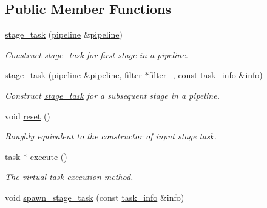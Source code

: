 \subsection*{Public Member Functions}
\begin{DoxyCompactItemize}
\item 
\hyperlink{classtbb_1_1internal_1_1stage__task_a7bfb2f0b49fa4d359d6466e2e291f041}{stage\+\_\+task} (\hyperlink{classtbb_1_1pipeline}{pipeline} \&\hyperlink{classtbb_1_1pipeline}{pipeline})
\begin{DoxyCompactList}\small\item\em Construct \hyperlink{classtbb_1_1internal_1_1stage__task}{stage\+\_\+task} for first stage in a pipeline. \end{DoxyCompactList}\item 
\hypertarget{classtbb_1_1internal_1_1stage__task_a7ace85497c8cb1d949ddd3a174d2bd1b}{}\hyperlink{classtbb_1_1internal_1_1stage__task_a7ace85497c8cb1d949ddd3a174d2bd1b}{stage\+\_\+task} (\hyperlink{classtbb_1_1pipeline}{pipeline} \&\hyperlink{classtbb_1_1pipeline}{pipeline}, \hyperlink{classtbb_1_1filter}{filter} $\ast$filter\+\_\+, const \hyperlink{structtbb_1_1internal_1_1task__info}{task\+\_\+info} \&info)\label{classtbb_1_1internal_1_1stage__task_a7ace85497c8cb1d949ddd3a174d2bd1b}

\begin{DoxyCompactList}\small\item\em Construct \hyperlink{classtbb_1_1internal_1_1stage__task}{stage\+\_\+task} for a subsequent stage in a pipeline. \end{DoxyCompactList}\item 
\hypertarget{classtbb_1_1internal_1_1stage__task_aa255c23e66c40065595caef2d9dda709}{}void \hyperlink{classtbb_1_1internal_1_1stage__task_aa255c23e66c40065595caef2d9dda709}{reset} ()\label{classtbb_1_1internal_1_1stage__task_aa255c23e66c40065595caef2d9dda709}

\begin{DoxyCompactList}\small\item\em Roughly equivalent to the constructor of input stage task. \end{DoxyCompactList}\item 
\hypertarget{classtbb_1_1internal_1_1stage__task_a8ae97273b0bbcce78e145edc90265f6b}{}task $\ast$ \hyperlink{classtbb_1_1internal_1_1stage__task_a8ae97273b0bbcce78e145edc90265f6b}{execute} ()\label{classtbb_1_1internal_1_1stage__task_a8ae97273b0bbcce78e145edc90265f6b}

\begin{DoxyCompactList}\small\item\em The virtual task execution method. \end{DoxyCompactList}\item 
\hypertarget{classtbb_1_1internal_1_1stage__task_a7dea701f85db88d580103a9b5a3d3dd9}{}void \hyperlink{classtbb_1_1internal_1_1stage__task_a7dea701f85db88d580103a9b5a3d3dd9}{spawn\+\_\+stage\+\_\+task} (const \hyperlink{structtbb_1_1internal_1_1task__info}{task\+\_\+info} \&info)\label{classtbb_1_1internal_1_1stage__task_a7dea701f85db88d580103a9b5a3d3dd9}


\end{DoxyCompactItemize}
